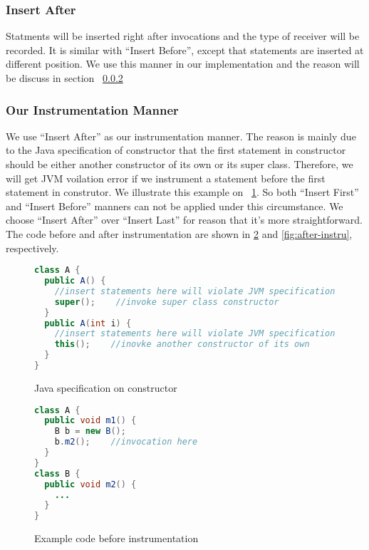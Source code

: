 \documentclass{fac}
\begin{document}
\subsubsection{Insert After}\label{subsubsec:insert-after}
Statments will be inserted right after invocations and the type of receiver will be recorded. It is similar with ``Insert Before'', except that statements are inserted at different position. We use this manner in our implementation and the reason will be discuss in section ~\ref{subsubsec:instrument}
\subsubsection{Our Instrumentation Manner}\label{subsubsec:instrument}
We use ``Insert After'' as our instrumentation manner. The reason is mainly due to the Java specification of constructor that the first statement in constructor should be either another constructor of its own or its super class. Therefore, we will get JVM voilation error if we instrument a statement before the first statement in construtor. We illustrate this example on ~\ref{fig:spec-constructor}. So both ``Insert First'' and ``Insert Before'' manners can not be applied under this circumstance. We choose ``Insert After'' over ``Insert Last'' for reason that it's more straightforward. The code before and after instrumentation are shown in \ref{fig:before-instru} and \ref{fig:after-instru}, respectively.

\begin{figure}
\begin{lstlisting}[language={java},frame={single}]
class A {
  public A() {
    //insert statements here will violate JVM specification
    super();	//invoke super class constructor
  }
  public A(int i) {
    //insert statements here will violate JVM specification
    this();    //inovke another constructor of its own
  }
}
\end{lstlisting}
\caption{Java specification on constructor}
\label{fig:spec-constructor}
\end{figure}

\begin{figure}
\centering
\begin{lstlisting}[language={java},frame={single}]
class A {
  public void m1() {
    B b = new B();
    b.m2();    //invocation here
  }
}
class B {
  public void m2() {
    ...
  }
}
\end{lstlisting}
\caption{Example code before instrumentation}
\label{fig:before-instru}
\end{figure}
\end{document}
